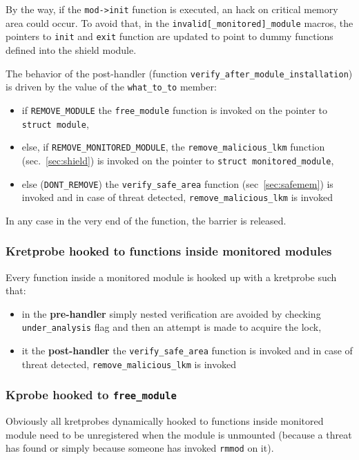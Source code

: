 \documentclass{article}
\begin{document}
	By the way, if the \texttt{mod->init} function is executed, an hack on critical memory area could occur. To avoid
	that, in the \texttt{invalid[\_monitored]\_module} macros, the pointers to \texttt{init} and \texttt{exit} function
	are updated to point to dummy functions defined into the shield module.

	The behavior of the post-handler (function \texttt{verify\_after\_module\_installation}) is driven by the value of
	the \texttt{what\_to\_to} member:
	\begin{itemize}
		\item if \texttt{REMOVE\_MODULE} the \texttt{free\_module} function is invoked on the pointer to \texttt{struct
		module},
		\item else, if \texttt{REMOVE\_MONITORED\_MODULE}, the \texttt{remove\_malicious\_lkm} function (sec.~\ref{sec:shield}) is invoked on the pointer to \texttt{struct monitored\_module},
		\item else (\texttt{DONT\_REMOVE}) the \texttt{verify\_safe\_area} function (sec~\ref{sec:safemem}) is invoked and in case of threat detected, \texttt{remove\_malicious\_lkm} is invoked
	\end{itemize}

	In any case in the very end of the function, the barrier is released.

	\subsubsection{Kretprobe hooked to functions inside monitored modules}
	Every function inside a monitored module is hooked up with a kretprobe such that:
	\begin{itemize}
		\item in the \textbf{pre-handler} simply nested verification are avoided by checking \texttt{under\_analysis}
		flag and then an attempt is made to acquire the lock,
		\item it the \textbf{post-handler} the \texttt{verify\_safe\_area} function is invoked and in case of threat
		detected, \texttt{remove\_malicious\_lkm} is invoked
	\end{itemize}

	\subsubsection{Kprobe hooked to \texttt{free\_module}}
	Obviously all kretprobes dynamically hooked to functions inside monitored module need to be unregistered when the
	module is unmounted (because a threat has found or simply because someone has invoked \texttt{rmmod} on it).
\end{document}
